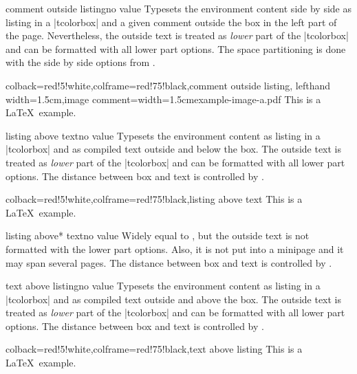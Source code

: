 \begin{docTcbKey}{comment outside listing}{}{no value}
Typesets the environment content side by side as listing in a |tcolorbox|
and a given comment outside the box in the left part of the page.
Nevertheless, the outside text is treated as \emph{lower} part of the
|tcolorbox| and can be formatted with all lower part options.
The space partitioning is done with the side by side options from
.
\begin{dispExample}
\begin{tcblisting}{colback=red!5!white,colframe=red!75!black,comment outside listing,
  lefthand width=1.5cm,image comment={width=1.5cm}{example-image-a.pdf}}
This is a \LaTeX\ example.
\end{tcblisting}
\end{dispExample}
\end{docTcbKey}



\begin{docTcbKey}{listing above text}{}{no value}
  Typesets the environment content as listing in a |tcolorbox|
  and as compiled text outside and below the box.
  The outside text is treated as \emph{lower} part of the
  |tcolorbox| and can be formatted with all lower part options.
  The distance between box and text is controlled by .
\begin{dispExample}
\begin{tcblisting}{colback=red!5!white,colframe=red!75!black,listing above text}
This is a \LaTeX\ example.
\end{tcblisting}
\end{dispExample}
\end{docTcbKey}


\begin{docTcbKey}[][doc new=2014-11-07]{listing above* text}{}{no value}
  Widely equal to , but the outside text is
  not formatted with the lower part options.
  Also, it is not put into a minipage and it may span several pages.
  The distance between box and text is controlled by .
\end{docTcbKey}

\clearpage

\begin{docTcbKey}{text above listing}{}{no value}
  Typesets the environment content as listing in a |tcolorbox|
  and as compiled text outside and above the box.
  The outside text is treated as \emph{lower} part of the
  |tcolorbox| and can be formatted with all lower part options.
  The distance between box and text is controlled by .
\begin{dispExample}
\begin{tcblisting}{colback=red!5!white,colframe=red!75!black,text above listing}
This is a \LaTeX\ example.
\end{tcblisting}
\end{dispExample}
\end{docTcbKey}


